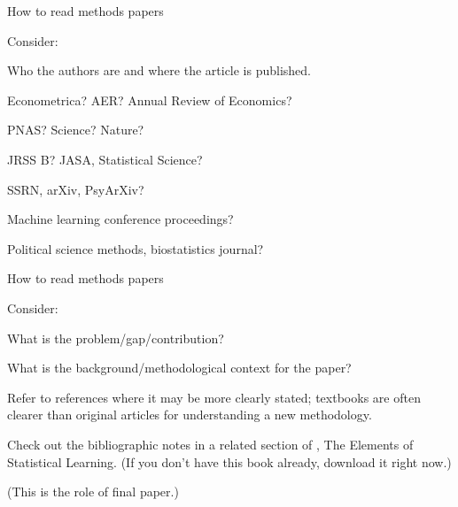 \documentclass[xcolor={dvipsnames}, handout]{beamer}
\begin{document}

\begin{frame}{How to read methods papers \citep{murphy1997read}}


Consider:\pause
\begin{wideitemize}
\item Who the authors are and where the article is published. \pause
\begin{wideitemize}
\item Econometrica? AER? Annual Review of Economics?
\item PNAS? Science? Nature?
\item JRSS B? JASA, Statistical Science?
\item SSRN, arXiv, PsyArXiv?
\item Machine learning conference proceedings?
\item Political science methods, biostatistics journal?
\end{wideitemize}
\end{wideitemize}

\end{frame}



\begin{frame}{How to read methods papers}

Consider:\pause
\begin{wideitemize}
\item What is the problem/gap/contribution? \pause
\item What is the background/methodological context for the paper? \pause
\begin{wideitemize}
\item Refer to references where it may be more clearly stated; textbooks are often clearer than original articles for understanding a new methodology. \pause
\item Check out the bibliographic notes in a related section of \cite{hastie2009elements}, The Elements of Statistical Learning. \pause (If you don't have this book already, download it right now.) \pause
\end{wideitemize}
\item (This is the role of final paper.)
\end{wideitemize}

\end{frame}
\end{document}
